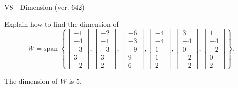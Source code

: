 \begin{exercise}
  \begin{exerciseTitle}V8 - Dimension (ver. 642)\end{exerciseTitle}
  \begin{exerciseStatement}
    Explain how to find the dimension of 
\[W=\mathrm{span}\ \left\{\left[\begin{array}{r}
-1 \\
-4 \\
-3 \\
3 \\
-2
\end{array}\right] , \left[\begin{array}{r}
-2 \\
-1 \\
-3 \\
3 \\
2
\end{array}\right] , \left[\begin{array}{r}
-6 \\
-3 \\
-9 \\
9 \\
6
\end{array}\right] , \left[\begin{array}{r}
-4 \\
-4 \\
1 \\
1 \\
2
\end{array}\right] , \left[\begin{array}{r}
3 \\
-4 \\
0 \\
-2 \\
-2
\end{array}\right] , \left[\begin{array}{r}
1 \\
-4 \\
-2 \\
0 \\
2
\end{array}\right]\right\}.\]



  \end{exerciseStatement}
  \begin{exerciseAnswer}
   The dimension of \(W\) is  \(5\).
  


  \end{exerciseAnswer}
\end{exercise}